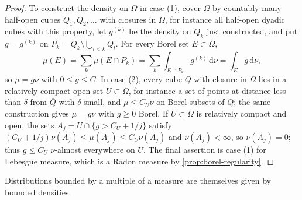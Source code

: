 \begin{proof}
To construct the density on $\Omega$ in case (1), cover $\Omega$ by countably many half-open cubes $Q_1,Q_2,\ldots$ with closures in $\Omega$, for instance all half-open dyadic cubes with this property, let $g^{(k)}$ be the density on $Q_k$ just constructed, and put $g=g^{(k)}$ on $P_k=Q_k\setminus\bigcup_{l<k}Q_l$. For every Borel set $E\subset\Omega$,
\[
 \mu(E)=\sum_k\mu(E\cap P_k)=\sum_k\int_{E\cap P_k}g^{(k)}\,\mathrm d\nu=\int_Eg\,\mathrm d\nu,
\]
so $\mu=g\nu$ with $0\leq g\leq C$. In case (2), every cube $Q$ with closure in $\Omega$ lies in a relatively compact open set $U\subset\Omega$, for instance a set of points at distance less than $\delta$ from $\overline Q$ with $\delta$ small, and $\mu\leq C_U\nu$ on Borel subsets of $Q$; the same construction gives $\mu=g\nu$ with $g\geq0$ Borel. If $U\subset\Omega$ is relatively compact and open, the sets $A_j=U\cap\{g>C_U+1/j\}$ satisfy $(C_U+1/j)\nu(A_j)\leq\mu(A_j)\leq C_U\nu(A_j)$ and $\nu(A_j)<\infty$, so $\nu(A_j)=0$; thus $g\leq C_U$ $\nu$-almost everywhere on $U$. The final assertion is case (1) for Lebesgue measure, which is a Radon measure by \cref{prop:borel-regularity}.
\end{proof}

Distributions bounded by a multiple of a measure are themselves given by bounded densities.

